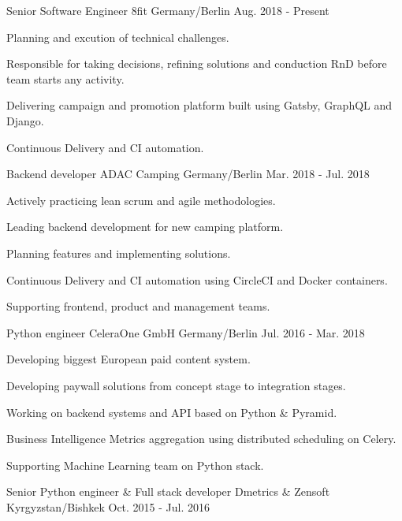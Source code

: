 \begin{cventries}
  \cventry
    {Senior Software Engineer}
    {8fit}
    {Germany/Berlin}
    {Aug. 2018 - Present}
    {
      \begin{cvitems}
        \item {Planning and excution of technical challenges.}
        \item {Responsible for taking decisions, refining solutions and conduction RnD before team starts any activity.}
        \item {Delivering campaign and promotion platform built using Gatsby, GraphQL and Django.}
        \item {Continuous Delivery and CI automation.}
      \end{cvitems}
    }
  \cventry
    {Backend developer}
    {ADAC Camping}
    {Germany/Berlin}
    {Mar. 2018 - Jul. 2018}
    {
      \begin{cvitems}
        \item {Actively practicing lean scrum and agile methodologies.}
        \item {Leading backend development for new camping platform.}
        \item {Planning features and implementing solutions.}
        \item {Continuous Delivery and CI automation using CircleCI and Docker containers.}
        \item {Supporting frontend, product and management teams.}
      \end{cvitems}
    }
  \cventry
    {Python engineer}
    {CeleraOne GmbH}
    {Germany/Berlin}
    {Jul. 2016 - Mar. 2018}
    {
      \begin{cvitems}
        \item {Developing biggest European paid content system.}
        \item {Developing paywall solutions from concept stage to integration stages.}
        \item {Working on backend systems and API based on Python \& Pyramid.}
        \item {Business Intelligence Metrics aggregation using distributed scheduling on Celery.}
        \item {Supporting Machine Learning team on Python stack.}
      \end{cvitems}
    }
  \cventry
    {Senior Python engineer \& Full stack developer}
    {Dmetrics \& Zensoft}
    {Kyrgyzstan/Bishkek}
    {Oct. 2015 - Jul. 2016}
    {
      \begin{cvitems}

\end{cvitems}}
\end{cventries}

